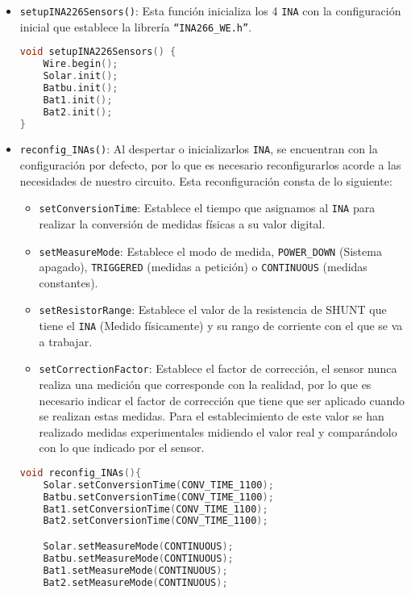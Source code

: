 \begin{itemize}
\item \texttt{setupINA226Sensors()}: Esta función inicializa los 4 \texttt{INA} con la configuración inicial que establece la librería \texttt{“INA266\_WE.h”}.

\begin{lstlisting}[captionpos=b, caption={Codigo función \texttt{setupINA226Sensors}}, language=c++]
void setupINA226Sensors() {
    Wire.begin();
    Solar.init();
    Batbu.init();
    Bat1.init();
    Bat2.init();
}
\end{lstlisting}

\item \texttt{reconfig\_INAs()}: Al despertar o inicializarlos \texttt{INA}, se encuentran con la configuración por defecto, por lo que es necesario reconfigurarlos acorde a las necesidades de nuestro circuito. Esta reconfiguración consta de lo siguiente:
\begin{itemize}
    \item \texttt{setConversionTime}: Establece el tiempo que asignamos al \texttt{INA} para realizar la conversión de medidas físicas a su valor digital.
    \item \texttt{setMeasureMode}: Establece el modo de medida, \texttt{POWER\_DOWN} (Sistema apagado), \texttt{TRIGGERED} (medidas a petición) o \texttt{CONTINUOUS} (medidas constantes).
    \item \texttt{setResistorRange}: Establece el valor de la resistencia de SHUNT que tiene el \texttt{INA} (Medido físicamente) y su rango de corriente con el que se va a trabajar.
    \item \texttt{setCorrectionFactor}: Establece el factor de corrección, el sensor nunca realiza una medición que corresponde con la realidad, por lo que es necesario indicar el factor de corrección que tiene que ser aplicado cuando se realizan estas medidas. Para el establecimiento de este valor se han realizado medidas experimentales midiendo el valor real y comparándolo con lo que indicado por el sensor.
\end{itemize}


\begin{lstlisting}[captionpos=b, caption={Codigo funcion reconfig\_INAs}, language=c++]
void reconfig_INAs(){
    Solar.setConversionTime(CONV_TIME_1100);
    Batbu.setConversionTime(CONV_TIME_1100);
    Bat1.setConversionTime(CONV_TIME_1100);
    Bat2.setConversionTime(CONV_TIME_1100);

    Solar.setMeasureMode(CONTINUOUS);
    Batbu.setMeasureMode(CONTINUOUS);
    Bat1.setMeasureMode(CONTINUOUS);
    Bat2.setMeasureMode(CONTINUOUS);
    

\end{lstlisting}
\end{itemize}

